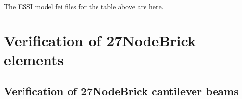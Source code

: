 \documentclass[fleqn,11pt]{article}
\begin{document}
The ESSI model fei files for the table above are \href{https://github.com/yuan-energy/ESSI_Verification/blob/master/8NodeBrick/circular_plate_simply_support/circular_plate_simply_support.tar.gz?raw=true}{here}.


































































\newpage

\section{Verification of 27NodeBrick elements}
\subsection{Verification of 27NodeBrick cantilever beams}

\end{document}
